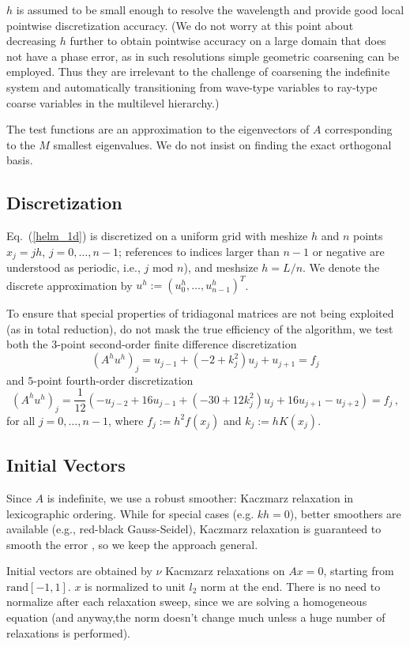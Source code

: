 \documentclass{article}
\begin{document}
$h$ is assumed to be small enough to resolve the wavelength and provide good local pointwise discretization accuracy. (We do not worry at this point about decreasing $h$ further to obtain pointwise accuracy on a large domain that does not have a phase error, as in such resolutions simple geometric coarsening can be employed. Thus they are irrelevant to the challenge of coarsening the indefinite system and automatically transitioning from wave-type variables to ray-type coarse variables in the multilevel hierarchy.)

The test functions are an approximation to the eigenvectors of $A$ corresponding to the $M$ smallest eigenvalues. We do not insist on finding the exact orthogonal basis.

\subsection{Discretization}
\label{discretization}
Eq.~(\ref{helm_1d}) is discretized on a uniform grid with meshize $h$ and $n$ points $x_j = j h$, $j= 0,\dots,n-1$; references to indices larger than $n - 1$ or negative are understood as periodic, i.e., $j \text{ mod } n$), and meshsize $h = L/n$. We denote the discrete approximation by $u^h := (u^h_0,\dots,u^h_{n-1})^T$.

To ensure that special properties of tridiagonal matrices are not being exploited (as in total reduction), 
do not mask the true efficiency of the algorithm, we test both the $3$-point second-order finite difference discretization 
$$ (A^h u^h)_j = u_{j-1} + (-2 + k_j^2) u_j + u_{j+1} = f_j$$
and $5$-point  fourth-order discretization
$$ (A^h u^h)_j = \frac{1}{12} \left( -u_{j-2} + 16 u_{j-1} + (-30 + 12 k_j^2) u_j + 16 u_{j+1} - u_{j+2} \right) = f_j\,, $$
for all $j = 0,\dots,n-1$, where $f_j := h^2 f(x_j)$ and $k_j := h K(x_j)$.

\subsection{Initial Vectors}
Since $A$ is indefinite, we use a robust smoother: Kaczmarz relaxation in lexicographic ordering. While for special cases (e.g. $k h = 0$), better smoothers are available (e.g., red-black Gauss-Seidel), Kaczmarz relaxation is guaranteed to smooth the error \cite{amg_theory}, so we keep the approach general.

Initial vectors are obtained by $\nu$ Kacmzarz relaxations on $A x = 0$, starting from $\text{rand}[-1, 1]$. $x$ is normalized to unit $l_2$ norm at the end. There is no need to normalize after each relaxation sweep, since we are solving a homogeneous equation (and anyway,the norm doesn't change much unless a huge number of relaxations is performed). 
\end{document}
